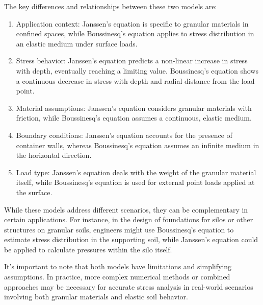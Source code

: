 \documentclass[xcolor=dvipsnames,10pt,hidelinks]{article}
\begin{document}
\begin{itemize}
The key differences and relationships between these two models are:

\begin{enumerate}
\item Application context: Janssen's equation is specific to granular materials in confined spaces, while Boussinesq's equation applies to stress distribution in an elastic medium under surface loads.

\item Stress behavior: Janssen's equation predicts a non-linear increase in stress with depth, eventually reaching a limiting value. Boussinesq's equation shows a continuous decrease in stress with depth and radial distance from the load point.

\item Material assumptions: Janssen's equation considers granular materials with friction, while Boussinesq's equation assumes a continuous, elastic medium.

\item Boundary conditions: Janssen's equation accounts for the presence of container walls, whereas Boussinesq's equation assumes an infinite medium in the horizontal direction.

\item Load type: Janssen's equation deals with the weight of the granular material itself, while Boussinesq's equation is used for external point loads applied at the surface.
\end{enumerate}

While these models address different scenarios, they can be complementary in certain applications. For instance, in the design of foundations for silos or other structures on granular soils, engineers might use Boussinesq's equation to estimate stress distribution in the supporting soil, while Janssen's equation could be applied to calculate pressures within the silo itself.

It's important to note that both models have limitations and simplifying assumptions. In practice, more complex numerical methods or combined approaches may be necessary for accurate stress analysis in real-world scenarios involving both granular materials and elastic soil behavior.


\end{itemize}
\end{document}
